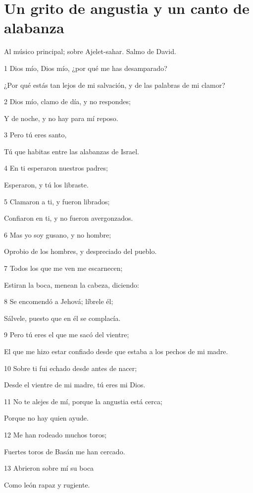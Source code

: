 \section*{Un grito de angustia y un canto de alabanza}

\par Al músico principal; sobre Ajelet-sahar. Salmo de David.

\par 1 Dios mío, Dios mío, ¿por qué me has desamparado?
\par ¿Por qué estás tan lejos de mi salvación, y de las palabras de mi clamor?
\par 2 Dios mío, clamo de día, y no respondes;
\par Y de noche, y no hay para mí reposo.
\par 3 Pero tú eres santo,
\par Tú que habitas entre las alabanzas de Israel.
\par 4 En ti esperaron nuestros padres;
\par Esperaron, y tú los libraste.
\par 5 Clamaron a ti, y fueron librados;
\par Confiaron en ti, y no fueron avergonzados.
\par 6 Mas yo soy gusano, y no hombre;
\par Oprobio de los hombres, y despreciado del pueblo.
\par 7 Todos los que me ven me escarnecen;
\par Estiran la boca, menean la cabeza,  diciendo:
\par 8 Se encomendó a Jehová; líbrele él;
\par Sálvele, puesto que en él se complacía.
\par 9 Pero tú eres el que me sacó del vientre;
\par El que me hizo estar confiado desde que estaba a los pechos de mi madre.
\par 10 Sobre ti fui echado desde antes de nacer;
\par Desde el vientre de mi madre, tú eres mi Dios.
\par 11 No te alejes de mí, porque la angustia está cerca;
\par Porque no hay quien ayude.
\par 12 Me han rodeado muchos toros;
\par Fuertes toros de Basán me han cercado.
\par 13 Abrieron sobre mí su boca
\par Como león rapaz y rugiente.
